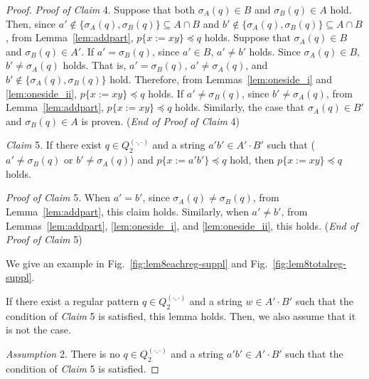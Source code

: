 \begin{proof}
\smallskip

\noindent
\textit{Proof of Claim} 4.
Suppose that both $\sigma_{A}(q) \in B$ and $\sigma_{B}(q) \in A$ hold. Then, since $a' \not\in \{\sigma_{A}(q), \sigma_{B}(q)\} \subseteq A\cap B$ and $b' \not\in \{\sigma_{A}(q), \sigma_{B}(q)\} \subseteq A\cap B$, from Lemma~\ref{lem:addpart}, $p\{x:=xy\} \preceq q$ holds.
Suppose that $\sigma_{A}(q)\in B$ and $\sigma_{B}(q)\in A'$.
If $a' = \sigma_{B}(q)$, since $a' \in B$, $a' \not= b'$ holds.
Since $\sigma_{A}(q)\in B$, $b' \not= \sigma_{A}(q)$ holds.
That is, $a' = \sigma_{B}(q)$, $a' \not= \sigma_{A}(q)$, and $b' \not\in \{\sigma_{A}(q), \sigma_{B}(q)\}$ hold.
Therefore, from Lemmas~\ref{lem:oneside_i} and \ref{lem:oneside_ii}, $p\{x:=xy\} \preceq q$ holds.
If $a' \not= \sigma_{B}(q)$, since $b' \not= \sigma_{A}(q)$, from Lemma~\ref{lem:addpart}, $p\{x:=xy\} \preceq q$ holds.
Similarly, the case that $\sigma_{A}(q)\in B'$ and $\sigma_{B}(q)\in A$ is proven. (\textit{End of Proof of Claim} 4)

\smallskip

\noindent
\textit{Claim} 5.
If there exist $q \in Q_{2}^{(\cdot,\cdot)}$ and a string $a'b' \in A'\cdot B'$ such that ($a' \not= \sigma_{B}(q)$ or $b' \not= \sigma_{A}(q)$) and $p\{x:=a'b'\} \preceq q$ hold, then $p\{x:=xy\} \preceq q$ holds.
 
\smallskip

\noindent
\textit{Proof of Claim} 5.
When $a'=b'$, since $\sigma_{A}(q) \not= \sigma_{B}(q)$, from Lemma~\ref{lem:addpart}, this claim holds. Similarly, when $a' \not = b'$, from Lemmas~\ref{lem:addpart}, \ref{lem:oneside_i}, and \ref{lem:oneside_ii}, this holds.  (\textit{End of Proof of Claim} 5)

\noindent
{\color{red} We give an example in Fig.~\ref{fig:lem8eachreg-suppl} and Fig.~\ref{fig:lem8totalreg-suppl}.}


\smallskip

\noindent
If there exist a regular pattern $q \in Q_{2}^{(\cdot,\cdot)}$ and a string $w \in A'\cdot B'$ such that the condition of \textit{Claim} 5 is satisfied, this lemma holds. Then, we also assume that it is not the case.

\smallskip

\noindent
\textit{Assumption} 2.
There is no $q \in Q_{2}^{(\cdot,\cdot)}$ and a string $a'b' \in A'\cdot B'$ such that the condition of \textit{Claim} 5 is satisfied.


\end{proof}

